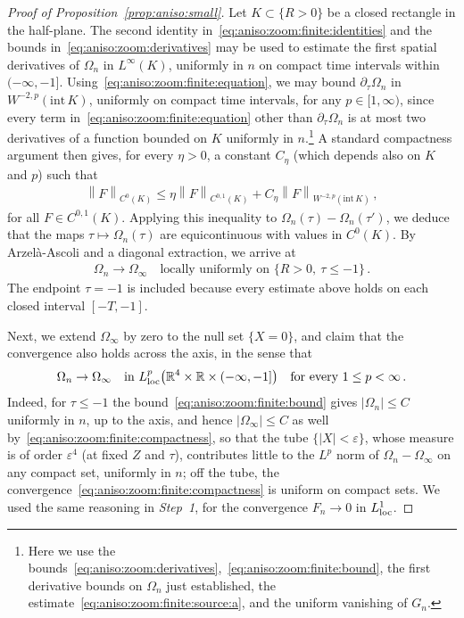 \documentclass[11pt,reqno]{amsproc}
\numberwithin{equation}{section}
\theoremstyle{remark}
\newcommand{\p}{\partial}
\newcommand{\RR}{\mathbb R}
\newcommand{\norm}[1]{\left\|#1\right\|}
\newcommand{\eps}{\varepsilon}
\begin{document}
\begin{proof}[Proof of Proposition~\ref{prop:aniso:small}]
Let $K\subset\{R>0\}$ be a closed rectangle in the half-plane. The second identity in~\eqref{eq:aniso:zoom:finite:identities} and the bounds in~\eqref{eq:aniso:zoom:derivatives} may be used to estimate the first spatial derivatives of $\Omega_n$ in $L^\infty(K)$, uniformly in $n$ on compact time intervals within $(-\infty,-1]$.
Using~\eqref{eq:aniso:zoom:finite:equation}, we may bound $\p_\tau\Omega_n$ in $W^{-2,p}(\mathrm{int}\,K)$, uniformly on compact time intervals, for any $p\in[1,\infty)$, since every term in~\eqref{eq:aniso:zoom:finite:equation} other than $\p_\tau\Omega_n$ is at most two derivatives of a function bounded on $K$ uniformly in $n$.\footnote{Here we use the bounds~\eqref{eq:aniso:zoom:derivatives},~\eqref{eq:aniso:zoom:finite:bound}, the first derivative bounds on $\Omega_n$ just established, the estimate~\eqref{eq:aniso:zoom:finite:source:a}, and the uniform vanishing of $G_n$.} A standard compactness argument then gives, for every $\eta>0$, a constant $C_\eta$ (which depends also on $K$ and $p$) such that
\begin{align*}
\norm{F}_{C^0(K)}\le\eta\norm{F}_{C^{0,1}(K)}+C_\eta\norm{F}_{W^{-2,p}(\mathrm{int}\,K)}
\,,
\end{align*}
for all $F \in C^{0,1}(K)$.
Applying this inequality to $\Omega_n(\tau)-\Omega_n(\tau')$, we deduce that the maps $\tau\mapsto\Omega_n(\tau)$ are equicontinuous with values in $C^0(K)$. By Arzel\`a-Ascoli and a diagonal extraction, we arrive at
\begin{align}
\Omega_n\to \Omega_\infty
\quad\mbox{locally uniformly on }\{R>0,\ \tau\le-1\}
\,.
\label{eq:aniso:zoom:finite:compactness}
\end{align}
The endpoint $\tau=-1$ is included because every estimate above holds on each closed interval $[-T,-1]$.

Next, we extend $\Omega_\infty$ by zero to the null set $\{X=0\}$, and claim that the convergence also holds across the axis, in the sense that
\begin{align}
\Omega_n\to\Omega_\infty
\quad\mbox{in } L^p_{\rm loc}\bigl(\RR^4\times\RR\times(-\infty,-1]\bigr)
\quad\mbox{for every } 1\le p<\infty
\label{eq:aniso:zoom:finite:strong}
\,.
\end{align}
Indeed, for $\tau\le-1$ the bound~\eqref{eq:aniso:zoom:finite:bound} gives $|\Omega_n|\le C$ uniformly in $n$, up to the axis, and hence $|\Omega_\infty|\le C$ as well by~\eqref{eq:aniso:zoom:finite:compactness}, so that the tube $\{|X|<\eps\}$, whose measure is of order $\eps^4$ (at fixed $Z$ and $\tau$), contributes little to the $L^p$ norm of $\Omega_n-\Omega_\infty$ on any compact set, uniformly in $n$; off the tube, the convergence~\eqref{eq:aniso:zoom:finite:compactness} is uniform on compact sets. We used the same reasoning in \emph{Step~1}, for the convergence $F_n\to0$ in $L^1_{\rm loc}$.


\end{proof}
\end{document}
